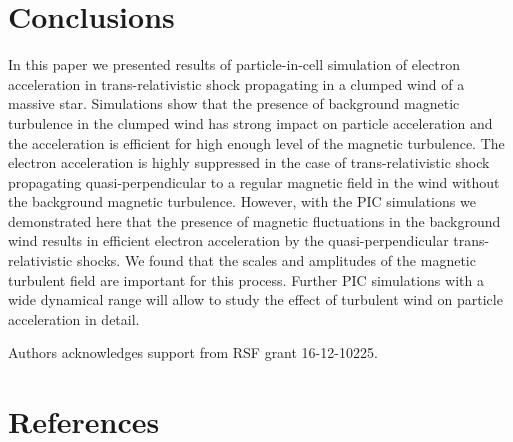 \documentclass[a4paper]{jpconf}
\begin{document}
\section{Conclusions}
In this paper we presented results of particle-in-cell simulation of electron acceleration in trans-relativistic shock propagating in a clumped  wind of a massive star. Simulations show that the presence  of background  magnetic turbulence in the clumped wind has strong impact on particle acceleration and the acceleration is efficient for high enough level of the magnetic turbulence. The electron acceleration is highly suppressed in the case of  trans-relativistic shock propagating quasi-perpendicular to a regular magnetic field in the wind without the background magnetic turbulence. However, with the PIC simulations we demonstrated here that the presence of magnetic fluctuations in the background wind results in efficient electron acceleration by the quasi-perpendicular trans-relativistic shocks. We found that the scales and amplitudes of the magnetic turbulent field are important for this process. Further PIC simulations with a wide dynamical range will allow to study the effect of turbulent wind on particle acceleration in detail.

\ack
Authors acknowledges support from RSF grant 16-12-10225.



\section*{References}



\end{document}
